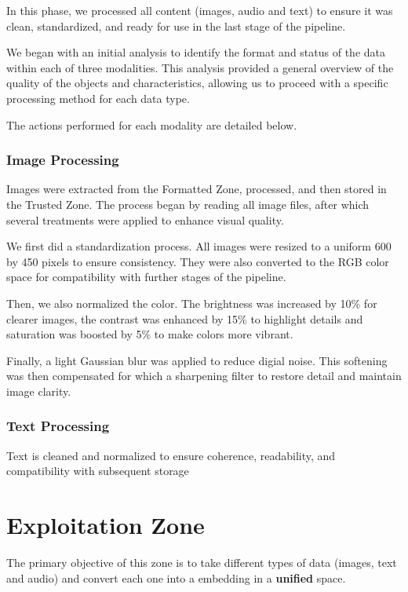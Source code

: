 \documentclass[12pt]{article}
\begin{document}
In this phase, we processed all content (images, audio and text) to ensure it was clean, standardized, and ready for use in the last stage of the pipeline.

We began with an initial analysis to identify the format and status of the data within each of three modalities. This analysis provided a general overview of the quality of the objects and characteristics, allowing us to proceed with a specific processing method for each data type.

The actions performed for each modality are detailed below.

\subsubsection{Image Processing}

Images were extracted from the Formatted Zone, processed, and then stored in the Trusted Zone. The process began by reading all image files, after which several treatments were applied to enhance visual quality.

We first did a standardization process. All images were resized to a uniform 600 by 450 pixels to ensure consistency. They were also converted to the RGB color space for compatibility with further stages of the pipeline.

Then, we also normalized the color. The brightness was increased by 10\% for clearer images, the contrast was enhanced by 15\% to highlight details and saturation was boosted by 5\% to make colors more vibrant.

Finally, a light Gaussian blur was applied to reduce digial noise. This softening was then compensated for which a sharpening filter to restore detail and maintain image clarity.

\subsubsection{Text Processing}

Text is cleaned and normalized to ensure coherence, readability, and compatibility with subsequent storage

\section{Exploitation Zone}

The primary objective of this zone is to take different types of data (images, text and audio) and convert each one into a embedding in a \textbf{unified} space.
\end{document}
